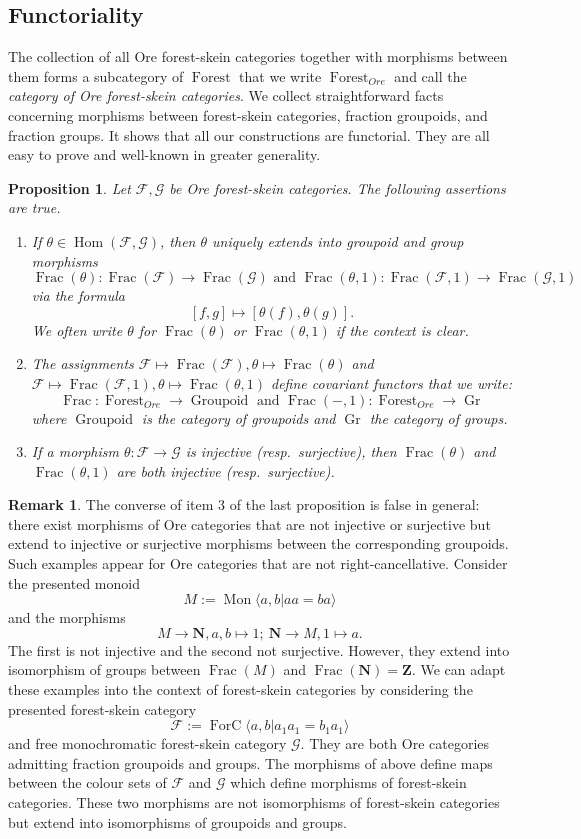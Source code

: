 \documentclass[a4paper, 12pt]{amsart}
\numberwithin{equation}{section}
\newtheorem{proposition}[theorem]{Proposition}
\theoremstyle{definition}
\newtheorem{remark}[theorem]{Remark}
\newcommand{\cF}{\mathcal F}
\DeclareMathOperator{\Frac}{Frac}
\DeclareMathOperator{\FC}{ForC}
\DeclareMathOperator{\Forest}{Forest}
\newcommand{\cG}{\mathcal G}
\DeclareMathOperator{\Gr}{Gr}
\DeclareMathOperator{\Groupoid}{Groupoid}
\DeclareMathOperator{\Hom}{Hom}
\newcommand{\la}{\langle}
\DeclareMathOperator{\Mon}{Mon}
\newcommand{\N}{\mathbf{N}}
\newcommand{\ra}{\rangle}
\newcommand{\Z}{\mathbf{Z}}
\begin{document}
\subsection{Functoriality}

The collection of all Ore forest-skein categories together with morphisms between them forms a subcategory of $\Forest$ that we write $\Forest_{Ore}$ and call the \textit{category of Ore forest-skein categories}.
We collect straightforward facts concerning morphisms between forest-skein categories, fraction groupoids, and fraction groups. It shows that all our constructions are functorial.
They are all easy to prove and well-known in greater generality.

\begin{proposition}\label{prop:morphisms}
Let $\cF,\cG$ be Ore forest-skein categories.
The following assertions are true.
\begin{enumerate}
\item If $\theta\in\Hom(\cF,\cG)$, then $\theta$ uniquely extends into groupoid and group morphisms
$$\Frac(\theta):\Frac(\cF)\to\Frac(\cG) \text{ and } \Frac(\theta,1):\Frac(\cF,1)\to\Frac(\cG,1)$$ 
via the formula
$$[f,g]\mapsto [\theta(f),\theta(g)].$$
We often write $\theta$ for $\Frac(\theta)$ or $\Frac(\theta,1)$ if the context is clear.
\item The assignments $\cF\mapsto \Frac(\cF), \theta\mapsto\Frac(\theta)$ and $\cF\mapsto \Frac(\cF,1), \theta\mapsto\Frac(\theta,1)$ define covariant functors that we write:
$$\Frac:\Forest_{Ore}\to \Groupoid \text{ and } \Frac(-,1):\Forest_{Ore}\to \Gr$$
where $\Groupoid$ is the category of groupoids and $\Gr$ the category of groups.
\item If a morphism $\theta:\cF\to\cG$ is injective (resp.~surjective), then $\Frac(\theta)$ and $\Frac(\theta,1)$ are both injective (resp.~surjective).
\end{enumerate}
\end{proposition}

\begin{remark}
The converse of item 3 of the last proposition is false in general: there exist morphisms of Ore categories that are not injective or surjective but extend to injective or surjective morphisms between the corresponding groupoids. 
Such examples appear for Ore categories that are not right-cancellative.
Consider the presented monoid
$$M:=\Mon\la a,b| aa=ba\ra$$
and the morphisms
$$M\to \N, a,b\mapsto 1 ; \ \N\to M, 1\mapsto a.$$
The first is not injective and the second not surjective. However, they extend into isomorphism of groups between $\Frac(M)$ and $\Frac(\N)=\Z.$
We can adapt these examples into the context of forest-skein categories by considering the presented forest-skein category $$\cF:=\FC\la a,b| a_1a_1=b_1a_1\ra$$ and free monochromatic forest-skein category $\cG$. They are both Ore categories admitting fraction groupoids and groups.
The morphisms of above define maps between the colour sets of $\cF$ and $\cG$ which define morphisms of forest-skein categories. 
These two morphisms are not isomorphisms of forest-skein categories but extend into isomorphisms of groupoids and groups.
\end{remark}
\end{document}
